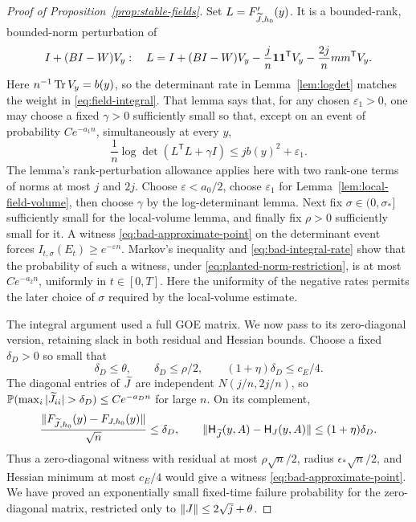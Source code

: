 \begin{proof}[Proof of Proposition~\ref{prop:stable-fields}]
Set $L=F'_{\widetilde J,h_0}(y)$.  It is a bounded-rank, bounded-norm
perturbation of
\[
 I+(BI-W)V_y:
 \quad L=I+(BI-W)V_y
       -\frac jn\mathbf 1\mathbf 1^{\mathsf T}V_y
       -\frac{2j}{n}mm^{\mathsf T}V_y.
\]
Here $n^{-1}\operatorname{Tr} V_y=b(y)$, so the determinant rate in
Lemma~\ref{lem:logdet} matches the weight in \eqref{eq:field-integral}.
That lemma says that, for any chosen $\varepsilon_1>0$, one may choose
a fixed $\gamma>0$ sufficiently
small so that, except on an event of probability $Ce^{-a_1n}$,
simultaneously at every $y$,
\[
 \frac1n\log\det(L^{\mathsf T}L+\gamma I)
 \le jb(y)^2+\varepsilon_1.
\]
The lemma's rank-perturbation allowance applies here with two rank-one
terms of norms at most $j$ and $2j$.
Choose $\varepsilon<a_0/2$, choose $\varepsilon_1$ for
Lemma~\ref{lem:local-field-volume}, then choose $\gamma$ by the
log-determinant lemma.  Next fix $\sigma\in(0,\sigma_*]$ sufficiently
small for the local-volume lemma, and finally fix $\rho>0$
sufficiently small for it.  A witness
\eqref{eq:bad-approximate-point} on the determinant event forces
$I_{t,\sigma}(E_t)\ge e^{-\varepsilon n}$.  Markov's inequality and
\eqref{eq:bad-integral-rate} show that the probability of such a
witness, under \eqref{eq:planted-norm-restriction}, is at most
$Ce^{-a_2n}$, uniformly in $t\in[0,T]$. Here the uniformity of the
negative rates permits the later choice of
$\sigma$ required by the local-volume estimate.

The integral argument used a full GOE matrix. We now pass to its
zero-diagonal version, retaining slack in both residual and Hessian bounds.
Choose a fixed
$\delta_D>0$ so small that
\[
 \delta_D\le\theta,\qquad
 \delta_D\le\rho/2,\qquad
 (1+\eta)\delta_D\le c_E/4.
\]
The diagonal entries of $\widetilde J$ are independent
$N(j/n,2j/n)$, so
$\Prob(\max_i|\wt J_{ii}|>\delta_D)\le Ce^{-a_Dn}$ for large $n$.
On its complement,
\[
 \frac{\lVert F_{\widetilde J,h_0}(y)-F_{J,h_0}(y)\rVert}{\sqrt n}
 \le\delta_D,\qquad
 \lVert \mathsf H_{\widetilde J}(y,A)-\mathsf H_J(y,A)\rVert
 \le(1+\eta)\delta_D.
\]
Thus a zero-diagonal witness with residual at most
$\rho\sqrt n/2$, radius $\epsilon_*\sqrt n/2$, and Hessian minimum
at most $c_E/4$ would give a witness
\eqref{eq:bad-approximate-point}.  We have proved an exponentially
small fixed-time failure probability for the zero-diagonal matrix,
restricted only to $\lVert J\rVert\le2\sqrt j+\theta$.


\end{proof}

